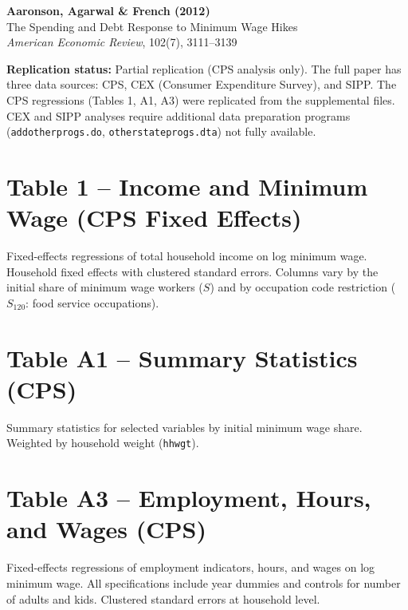\documentclass[12pt]{article}
\begin{document}
\begin{center}
{\Large\bfseries Aaronson, Agarwal \& French (2012)}\\
{\large The Spending and Debt Response to Minimum Wage Hikes}\\
\vspace{0.5em}
{\normalsize \textit{American Economic Review}, 102(7), 3111--3139}
\end{center}

\vspace{1em}
\noindent\textbf{Replication status:} Partial replication (CPS analysis only).
The full paper has three data sources: CPS, CEX (Consumer Expenditure Survey), and SIPP.
The CPS regressions (Tables 1, A1, A3) were replicated from the supplemental files.
CEX and SIPP analyses require additional data preparation programs
(\texttt{addotherprogs.do}, \texttt{otherstateprogs.dta}) not fully available.

\tableofcontents

\clearpage
\section{Table 1 -- Income and Minimum Wage (CPS Fixed Effects)}

Fixed-effects regressions of total household income on log minimum wage.
Household fixed effects with clustered standard errors.
Columns vary by the initial share of minimum wage workers ($S$) and
by occupation code restriction ($S_{120}$: food service occupations).

\vspace{1em}


\clearpage
\section{Table A1 -- Summary Statistics (CPS)}

Summary statistics for selected variables by initial minimum wage share.
Weighted by household weight (\texttt{hhwgt}).

\vspace{1em}
\begin{center}

\end{center}

\clearpage
\section{Table A3 -- Employment, Hours, and Wages (CPS)}

Fixed-effects regressions of employment indicators, hours, and wages
on log minimum wage. All specifications include year dummies and
controls for number of adults and kids. Clustered standard errors at
household level.

\vspace{1em}

\end{document}
